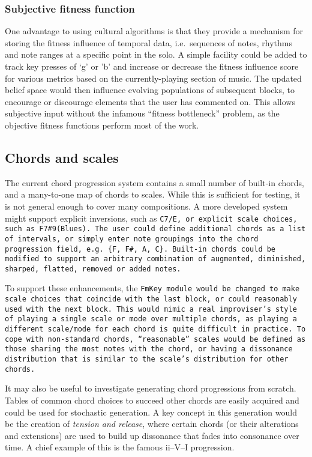 \subsubsection{Subjective fitness function}

One advantage to using cultural algorithms is that they provide a mechanism for storing the fitness influence of temporal data, i.e.\ sequences of notes, rhythms and note ranges at a specific point in the solo. A simple facility could be added to track key presses of `g' or 'b' \citep[for ``good'' or ``bad'', as used by][]{biles94} and increase or decrease the fitness influence score for various metrics based on the currently-playing section of music. The updated belief space would then influence evolving populations of subsequent blocks, to encourage or discourage elements that the user has commented on. This allows subjective input without the infamous ``fitness bottleneck'' problem, as the objective fitness functions perform most of the work.

\subsection{Chords and scales}

The current chord progression system contains a small number of built-in chords, and a many-to-one map of chords to scales. While this is sufficient for testing,
it is not general enough to cover many compositions. A more developed system might support explicit inversions, such as \tt{C7/E}, or explicit scale choices, such as \tt{F7\#9(Blues)}. The user could define additional chords as a list of intervals, or simply enter note groupings into the chord progression field, e.g.\ \verb!{F, F#, A, C}!. Built-in chords could be modified to support an arbitrary combination of augmented, diminished, sharped, flatted, removed or added notes.

To support these enhancements, the \tt{FmKey} module would be changed to make scale choices that coincide with the last block, or could reasonably used with the next block. This would mimic a real improviser's style of playing a single scale or mode over multiple chords, as playing a different scale/mode for each chord is quite difficult in practice. To cope with non-standard chords, ``reasonable'' scales would be defined as those sharing the most notes with the chord, or having a dissonance distribution that is similar to the scale's distribution for other chords.

It may also be useful to investigate generating chord progressions from scratch. Tables of common chord choices to succeed other chords are easily acquired and could be used for stochastic generation. A key concept in this generation would be the creation of \emph{tension and release}, where certain chords (or their alterations and extensions) are used to build up dissonance that fades into consonance over time. A chief example of this is the famous ii--V--I progression.

